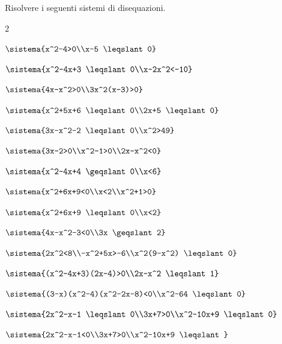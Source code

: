 \begin{esercizio}[*]
\label{ese:4.75}
Risolvere i seguenti sistemi di disequazioni.
\begin{htmulticols}{2}
\begin{enumeratea}
\item \(\sistema{x^2-4>0\\x-5 \leqslant 0}\) 
\item \(\sistema{x^2-4x+3 \leqslant 
0\\x-2x^2<-10}\)
\item \(\sistema{4x-x^2>0\\3x^2(x-3)>0}\)
\item \(\sistema{x^2+5x+6 \leqslant 0\\2x+5 \leqslant 
0}\)
\item \(\sistema{3x-x^2-2 \leqslant 0\\x^2>49}\)
\item \(\sistema{3x-2>0\\x^2-1>0\\2x-x^2<0}\)
\item \(\sistema{x^2-4x+4 \geqslant 0\\x<6}\)
\item \(\sistema{x^2+6x+9<0\\x<2\\x^2+1>0}\)
\sol{\emptyset}
\item \(\sistema{x^2+6x+9 \leqslant 0\\x<2}\)
\item \(\sistema{4x-x^2-3<0\\3x \geqslant 2}\)
\item \(\sistema{2x^2<8\\-x^2+5x>-6\\x^2(9-x^2) \leqslant 0}\)
\item \(\sistema{(x^2-4x+3)(2x-4)>0\\2x-x^2 \leqslant 1}\)
\item \(\sistema{(3-x)(x^2-4)(x^2-2x-8)<0\\x^2-64 \leqslant 0}\)
\item \(\sistema{2x^2-x-1 \leqslant 0\\3x+7>0\\x^2-10x+9 \leqslant 0}\)
\item \(\sistema{2x^2-x-1<0\\3x+7>0\\x^2-10x+9 \leqslant }\)

\end{enumeratea}
\end{htmulticols}
\end{esercizio}
